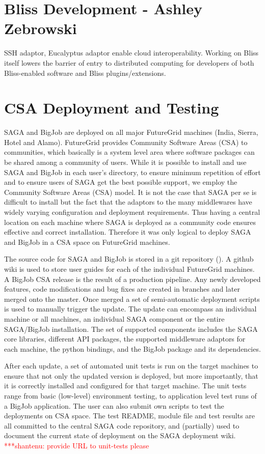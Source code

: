 \documentclass[]{paper}
\newcommand{\jhanote}[1]{ {\textcolor{red} { ***shantenu: #1 }}}
\newcommand{\jhanote}[1]{}
\begin{document}
\section{Bliss Development - Ashley Zebrowski}
SSH adaptor, Eucalyptus adaptor enable cloud interoperability.  Working on 
Bliss itself lowers the barrier of entry to distributed computing for developers
of both Bliss-enabled software and Bliss plugins/extensions.

\section{CSA Deployment and Testing}


SAGA and BigJob are deployed on all major FutureGrid machines (India,
Sierra, Hotel and Alamo).  FutureGrid provides Community Software
Areas (CSA) to communities, which basically is a system level area
where software packages can be shared among a community of users.
While it is possible to install and use SAGA and BigJob in each user's
directory, to ensure minimum repetition of effort and to ensure users
of SAGA get the best possible support, we employ the Community
Software Areas (CSA) model.  It is not the case that SAGA per se is
difficult to install but the fact that the adaptors to the many
middlewares have widely varying configuration and deployment
requirements.  Thus having a central location on each machine where
SAGA is deployed as a community code ensures effective and correct
installation.  Therefore it was only logical to deploy SAGA and BigJob
in a CSA space on FutureGrid machines.

The source code for SAGA and BigJob is stored in a git repository
(\cite{bigjob_web}). A github wiki is used to store user guides for
each of the individual FutureGrid machines. A BigJob CSA release is
the result of a production pipeline. Any newly developed features,
code modifications and bug fixes are created in branches and later
merged onto the master. Once merged a set of semi-automatic deployment
scripts is used to manually trigger the update. The update can
encompass an individual machine or all machines, an individual SAGA
component or the entire SAGA/BigJob installation. The set of supported
components includes the SAGA core libraries, different API packages,
the supported middleware adaptors for each machine, the python
bindings, and the BigJob package and its dependencies.

After each update, a set of automated unit tests is run on the target
machines to ensure that not only the updated version is deployed, but
more importantly, that it is correctly installed and configured for
that target machine. The unit tests range from basic (low-level)
environment testing, to application level test runs of a BigJob
application. The user can also submit own scripts to test the
deployments on CSA space. The test README, module file and test
results are all committed to the central SAGA code repository, and
(partially) used to document the current state of deployment on the
SAGA deployment wiki.  \jhanote{provide URL to unit-tests please}
\end{document}

